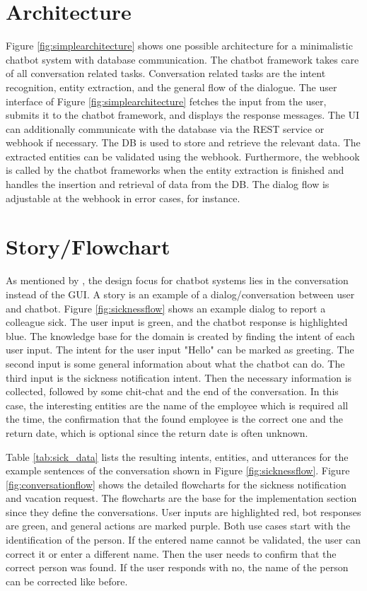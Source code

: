 \section{Architecture}

Figure \ref{fig:simplearchitecture} shows one possible architecture for a minimalistic chatbot system with database communication.
The chatbot framework takes care of all conversation related tasks. 
Conversation related tasks are the intent recognition, entity extraction, and the general flow of the dialogue. 
The user interface of Figure \ref{fig:simplearchitecture} fetches the input from the user, submits it to the chatbot framework, and displays the response messages. 
The UI can additionally communicate with the database via the REST service or webhook if necessary.
The DB is used to store and retrieve the relevant data.
The extracted entities can be validated using the webhook.
Furthermore, the webhook is called by the chatbot frameworks when the entity extraction is finished and handles the insertion and retrieval of data from the DB.
The dialog flow is adjustable at the webhook in error cases, for instance.

 \section{Story/Flowchart}
 As mentioned by \citet{folstad2017chatbots}, the design focus for chatbot systems lies in the conversation instead of the GUI.
 A story is an example of a dialog/conversation between user and chatbot.
Figure \ref{fig:sicknessflow} shows an example dialog to report a colleague sick.
The user input is green, and the chatbot response is highlighted blue.
The knowledge base for the domain is created by finding the intent of each user input.
 The intent for the user input "Hello" can be marked as greeting.
The second input is some general information about what the chatbot can do. 
The third input is the sickness notification intent. 
Then the necessary information is collected, followed by some chit-chat and the end of the conversation. 
 In this case, the interesting entities are the name of the employee which is required all the time, the confirmation that the found employee is the 
 correct one and the return date, which is optional since the return date is often unknown.

Table \ref{tab:sick_data} lists the resulting intents, entities, and utterances for the example sentences of the conversation shown in Figure \ref{fig:sicknessflow}.
 Figure \ref{fig:conversationflow} shows the detailed flowcharts for the sickness notification and vacation request. 
The flowcharts are the base for the implementation section since they define the conversations.
 User inputs are highlighted red, bot responses are green, and general actions are marked purple.
 Both use cases start with the identification of the person.
 If the entered name cannot be validated, the user can correct it or enter a different name.
 Then the user needs to confirm that the correct person was found.
 If the user responds with no, the name of the person can be corrected like before.

